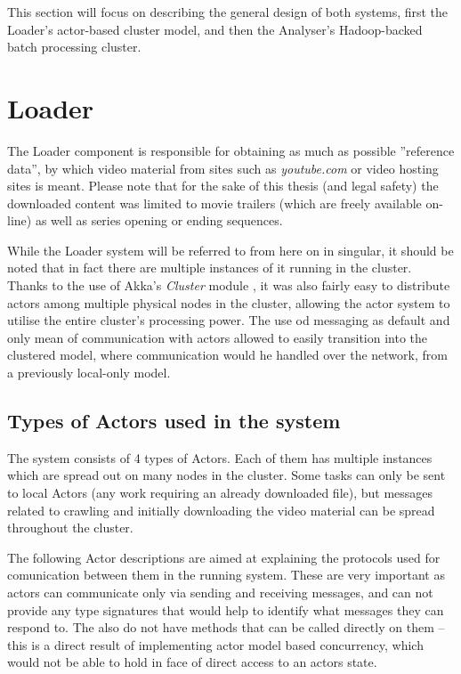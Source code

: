 This section will focus on describing the general design of both systems, first the Loader's actor-based cluster model, and then the Analyser's Hadoop-backed batch processing cluster.

\section{Loader}
\label{sec:loader-basics}
The Loader component is responsible for obtaining as much as possible ''reference data'', by which video material from sites such as \textit{youtube.com} or video hosting sites is meant. Please note that for the sake of this thesis (and legal safety) the downloaded content was limited to movie trailers (which are freely available on-line) as well as series opening or ending sequences.

While the Loader system will be referred to from here on in singular, it should be noted that in fact there are multiple instances of it running in the cluster. Thanks to the use of Akka's \textit{Cluster} module \cite{akka-cluster}, it was also fairly easy to distribute actors among multiple physical nodes in the cluster, allowing the actor system to utilise the entire cluster's processing power. The use od messaging as default and only mean of communication with actors allowed to easily transition into the clustered model, where communication would he handled over the network, from a previously local-only model.

\subsection{Types of Actors used in the system}
\label{sec:types-of-actors}

The system consists of 4 types of Actors. Each of them has multiple instances which are spread out on many nodes in the cluster. Some tasks can only be sent to local Actors (any work requiring an already downloaded file), but messages related to crawling and initially downloading the video material can be spread throughout the cluster. 

The following Actor descriptions are aimed at explaining the protocols used for comunication between them in the running system. These are very important as actors can communicate only via sending and receiving messages, and can not provide any type signatures that would help to identify what messages they can respond to. The also do not have methods that can be called directly on them -- this is a direct result of implementing actor model based concurrency, which would not be able to hold in face of direct access to an actors state.


